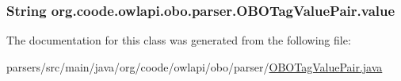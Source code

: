 \hypertarget{classorg_1_1coode_1_1owlapi_1_1obo_1_1parser_1_1_o_b_o_tag_value_pair_a468a379caaef83e65126994bf1646a69}{
\subsubsection[{value}]{\setlength{\rightskip}{0pt plus 5cm}String org.\-coode.\-owlapi.\-obo.\-parser.\-O\-B\-O\-Tag\-Value\-Pair.\-value\hspace{0.3cm}{\ttfamily [private]}}}\label{classorg_1_1coode_1_1owlapi_1_1obo_1_1parser_1_1_o_b_o_tag_value_pair_a468a379caaef83e65126994bf1646a69}


The documentation for this class was generated from the following file\-:\begin{DoxyCompactItemize}
\item 
parsers/src/main/java/org/coode/owlapi/obo/parser/\hyperlink{_o_b_o_tag_value_pair_8java}{O\-B\-O\-Tag\-Value\-Pair.\-java}\end{DoxyCompactItemize}
